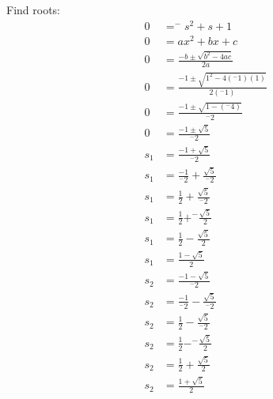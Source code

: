\documentclass{article}
\begin{document}
Find roots:
\begin{align*}
0 & = ^{-}s^2 + s + 1\\
0 &= ax^2 + bx + c \\
0 &= \frac{-b \pm \sqrt{b^2 - 4ac}}{2a} \\ 
0 &= \frac{-1 \pm \sqrt{1^2 - 4(^{-}1)(1)}}{2(^{-}1)} \\ 
0 &= \frac{-1 \pm \sqrt{1 - (^{-}4)}}{^{-}2} \\ 
0 &= \frac{-1 \pm \sqrt{5}}{^{-}2} \\ 
s_1 &= \frac{-1 + \sqrt{5}}{^{-}2} \\ 
s_1 &= \frac{-1}{^{-}2} + \frac{\sqrt{5}}{^{-}2} \\ 
s_1 &= \frac{1}{2} + \frac{\sqrt{5}}{^{-}2} \\ 
s_1 &= \frac{1}{2} + ^{-}\frac{\sqrt{5}}{2} \\ 
s_1 &= \frac{1}{2} - \frac{\sqrt{5}}{2} \\ 
s_1 &= \frac{1-\sqrt{5}}{2} \\ 
s_2 &= \frac{-1 - \sqrt{5}}{^{-}2} \\ 
s_2 &= \frac{-1}{^{-}2} - \frac{\sqrt{5}}{^{-}2}\\ 
s_2 &= \frac{1}{2} - \frac{\sqrt{5}}{^{-}2}\\ 
s_2 &= \frac{1}{2} - ^{-}\frac{\sqrt{5}}{2}\\ 
s_2 &= \frac{1}{2} + \frac{\sqrt{5}}{2}\\ 
s_2 &= \frac{1 + \sqrt{5}}{2}\\ 
\end{align*}
\end{document}
